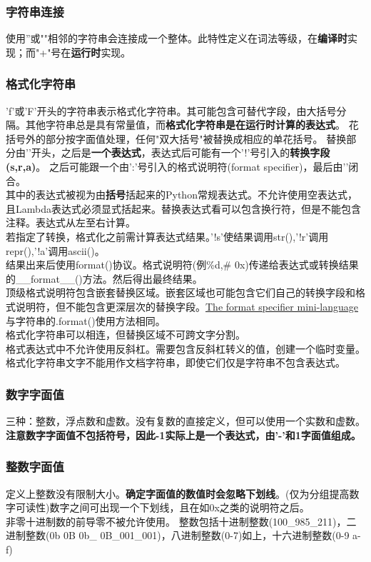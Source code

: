 \documentclass[10pt,UTF8]{ctexart}
\begin{document}
\subsubsection{字符串连接}
使用''或""相邻的字符串会连接成一个整体。此特性定义在词法等级，在\textbf{编译时}实现；而"+"号在\textbf{运行时}实现。
\subsubsection{格式化字符串}
'f'或'F'开头的字符串表示格式化字符串。其可能包含可替代字段，由大括号分隔。其他字符串总是具有常量值，而\textbf{格式化字符串是在运行时计算的表达式}。
花括号外的部分按字面值处理，任何"双大括号"被替换成相应的单花括号。
替换部分由'{'开头，之后是\textbf{一个表达式}，表达式后可能有一个'!'号引入的\textbf{转换字段(s,r,a)}。
之后可能跟一个由':'号引入的格式说明符(format specifier)，最后由'}'闭合。\\
\indent 其中的表达式被视为由\textbf{括号}括起来的Python常规表达式。不允许使用空表达式，且Lambda表达式必须显式括起来。替换表达式看可以包含换行符，但是不能包含注释。表达式从左至右计算。\\
\indent 若指定了转换，格式化之前需计算表达式结果。'!s'使结果调用str(),'!r'调用repr(),'!a'调用ascii()。\\
\indent 结果出来后使用format()协议。格式说明符(例\%d,\# 0x)传递给表达式或转换结果的\_\_format\_\_()方法。然后得出最终结果。\\
\indent 顶级格式说明符包含嵌套替换区域。嵌套区域也可能包含它们自己的转换字段和格式说明符，但不能包含更深层次的替换字段。\href{https://docs.python.org/3/library/string.html#formatspec}{The format specifier mini-language}与字符串的.format()使用方法相同。\\
\indent 格式化字符串可以相连，但替换区域不可跨文字分割。\\
\indent 格式表达式中不允许使用反斜杠。需要包含反斜杠转义的值，创建一个临时变量。\\
\indent 格式化字符串文字不能用作文档字符串，即使它们仅是字符串不包含表达式。
\subsubsection{数字字面值}
三种：整数，浮点数和虚数。没有复数的直接定义，但可以使用一个实数和虚数。\\
\indent \textbf{注意数字字面值不包括符号，因此-1实际上是一个表达式，由'-'和1字面值组成。}
\subsubsection{整数字面值}
定义上整数没有限制大小。\textbf{确定字面值的数值时会忽略下划线}。(仅为分组提高数字可读性)数字之间可出现一个下划线，且在如0x之类的说明符之后。\\
\indent 非零十进制数的前导零不被允许使用。
\indent 整数包括十进制整数(100\_985\_211)，二进制整数(0b 0B 0b\_ 0B\_001\_001)，八进制整数(0-7)如上，十六进制整数(0-9 a-f)
\end{document}
